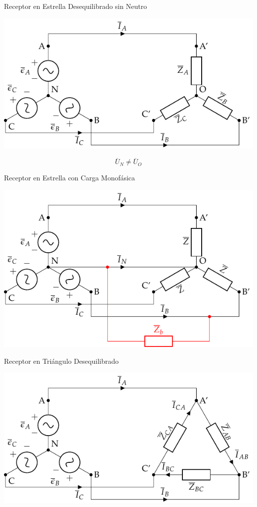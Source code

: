 \documentclass[aspectratio=169, usenames,svgnames,dvipsnames]{beamer}
\begin{document}
\begin{frame}[label={sec:orgb82b88c}]{Receptor en Estrella Desequilibrado sin Neutro}
\begin{center}
\includegraphics[width=.9\linewidth]{../figs/EstrellaDesequilibrado_SinNeutro.pdf}
\end{center}

\[
\overline{U}_N \neq \overline{U}_{O}
\]
\end{frame}
\begin{frame}[label={sec:orge7c828c}]{Receptor en Estrella con Carga Monofásica}
\begin{center}
\includegraphics[height=0.9\textheight]{../figs/Estrella_CargaMonofasica.pdf}
\end{center}
\end{frame}
\begin{frame}[label={sec:org492aebb}]{Receptor en Triángulo Desequilibrado}
\begin{center}
\includegraphics[height=0.9\textheight]{../figs/TrianguloDesequilibrado.pdf}
\end{center}
\end{frame}
\end{document}
